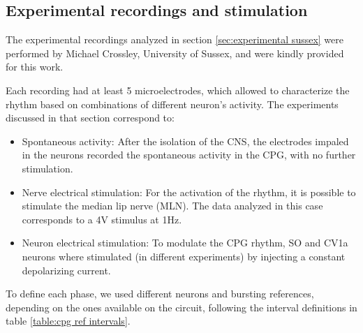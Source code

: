 \subsection{Experimental recordings and stimulation}
\label{subsec:methods experimental intervals}
The experimental recordings analyzed in section \ref{sec:experimental sussex} were performed by Michael Crossley, University of Sussex, and were kindly provided for this work. 

Each recording had at least 5 microelectrodes, which allowed to characterize the rhythm based on combinations of different neuron's activity. The experiments discussed in that section correspond to:
\begin{itemize}
	\item Spontaneous activity: After the isolation of the CNS, the electrodes impaled in the neurons recorded the spontaneous activity in the CPG, with no further stimulation.
	\item Nerve electrical stimulation: For the activation of the rhythm, it is possible to stimulate the median lip nerve (MLN). The data analyzed in this case corresponds to a 4V stimulus at 1Hz. 
	\item Neuron electrical stimulation: To modulate the CPG rhythm, SO and CV1a neurons where stimulated (in different experiments) by injecting a constant depolarizing current.
\end{itemize}

To define each phase, we used different neurons and bursting references, depending on the ones available on the circuit, following the interval definitions in table \ref{table:cpg ref intervals}.

